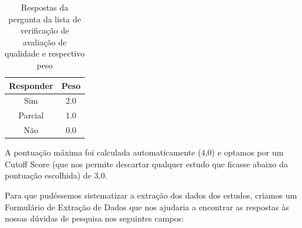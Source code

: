 \begin{table}[ht]
    \centering
        \caption{Respostas da pergunta da lista de verificação de avaliação de qualidade e respectivo peso}
        \begin{tabular}{c|c}
            \hline
                \textbf{Responder} & \textbf{Peso} \\
            \hline
            \hline
                Sim & 2.0 \\
            \hline
                Parcial & 1.0 \\
            \hline
                Não & 0.0 \\
            \hline
        \end{tabular}
    \label{tab:scoring_weight}
\end{table}

A pontuação máxima foi calculada automaticamente (4,0) e optamos por um Cutoff Score (que nos permite descartar qualquer estudo que ficasse abaixo da pontuação escolhida) de 3,0.

Para que pudéssemos sistematizar a extração dos dados dos estudos, criamos um Formulário de Extração de Dados que nos ajudaria a encontrar as respostas às nossas dúvidas de pesquisa nos seguintes campos:

